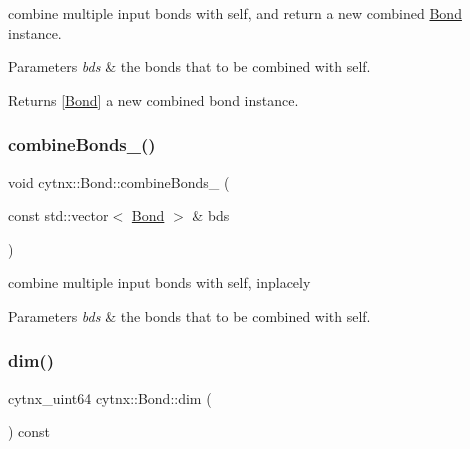 combine multiple input bonds with self, and return a new combined \hyperlink{classcytnx_1_1Bond}{Bond} instance. 


\begin{DoxyParams}{Parameters}
{\em bds} & the bonds that to be combined with self. \\
\hline
\end{DoxyParams}
\begin{DoxyReturn}{Returns}
\mbox{[}\hyperlink{classcytnx_1_1Bond}{Bond}\mbox{]} a new combined bond instance. 
\end{DoxyReturn}
\mbox{\label{classcytnx_1_1Bond_a1fd655bfe0845839502b6e385d743078}} 
\subsubsection{\texorpdfstring{combine\+Bonds\+\_\+()}{combineBonds\_()}}
{\footnotesize\ttfamily void cytnx\+::\+Bond\+::combine\+Bonds\+\_\+ (\begin{DoxyParamCaption}\item[{const std\+::vector$<$ \hyperlink{classcytnx_1_1Bond}{Bond} $>$ \&}]{bds }\end{DoxyParamCaption})\hspace{0.3cm}{\ttfamily [inline]}}



combine multiple input bonds with self, inplacely 


\begin{DoxyParams}{Parameters}
{\em bds} & the bonds that to be combined with self. \\
\hline
\end{DoxyParams}
\mbox{\label{classcytnx_1_1Bond_aa072647e03a4c797479445bd41b9eacf}} 
\subsubsection{\texorpdfstring{dim()}{dim()}}
{\footnotesize\ttfamily cytnx\+\_\+uint64 cytnx\+::\+Bond\+::dim (\begin{DoxyParamCaption}{ }\end{DoxyParamCaption}) const\hspace{0.3cm}{\ttfamily [inline]}}



